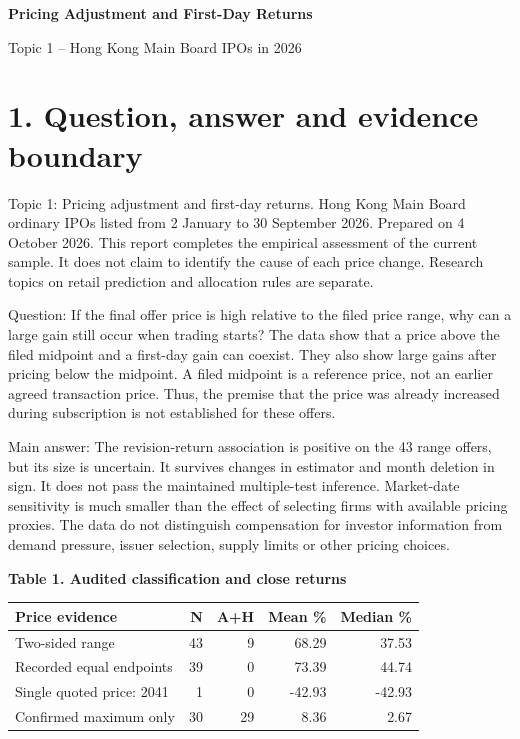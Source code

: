 \documentclass[10pt,a4paper]{article}
\begin{document}
{\LARGE\bfseries Pricing Adjustment and First-Day Returns}\par\addvspace{4pt}
{\large Topic 1 -- Hong Kong Main Board IPOs in 2026}\par\addvspace{4pt}
\section*{1. Question, answer and evidence boundary}

Topic 1: Pricing adjustment and first-day returns. Hong Kong Main Board ordinary IPOs listed from 2 January to 30 September 2026. Prepared on 4 October 2026. This report completes the empirical assessment of the current sample. It does not claim to identify the cause of each price change. Research topics on retail prediction and allocation rules are separate.

Question: If the final offer price is high relative to the filed price range, why can a large gain still occur when trading starts? The data show that a price above the filed midpoint and a first-day gain can coexist. They also show large gains after pricing below the midpoint. A filed midpoint is a reference price, not an earlier agreed transaction price. Thus, the premise that the price was already increased during subscription is not established for these offers.

Main answer: The revision-return association is positive on the 43 range offers, but its size is uncertain. It survives changes in estimator and month deletion in sign. It does not pass the maintained multiple-test inference. Market-date sensitivity is much smaller than the effect of selecting firms with available pricing proxies. The data do not distinguish compensation for investor information from demand pressure, issuer selection, supply limits or other pricing choices.

\par\addvspace{5pt}\textbf{Table 1. Audited classification and close returns}\par\nobreak\vspace{2pt}

{\small\renewcommand{\arraystretch}{1.10}\begin{tabularx}{\textwidth}{@{}Xrrrr@{}}\toprule

\textbf{Price evidence} & \textbf{N} & \textbf{A+H} & \textbf{Mean \%} & \textbf{Median \%} \\\midrule

Two-sided range & 43 & 9 & 68.29 & 37.53 \\

Recorded equal endpoints & 39 & 0 & 73.39 & 44.74 \\

Single quoted price: 2041 & 1 & 0 & -42.93 & -42.93 \\

Confirmed maximum only & 30 & 29 & 8.36 & 2.67 \\

\bottomrule\end{tabularx}}\par
\end{document}
